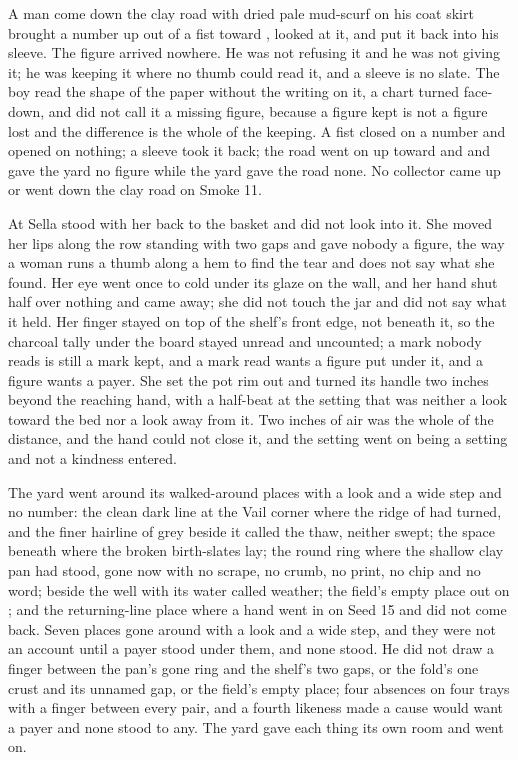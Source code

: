 A man come down the clay road with dried pale mud-scurf on his coat skirt brought a number up out of a fist toward , looked at it, and put it back into his sleeve. The figure arrived nowhere. He was not refusing it and he was not giving it; he was keeping it where no thumb could read it, and a sleeve is no slate. The boy read the shape of the paper without the writing on it, a chart turned face-down, and did not call it a missing figure, because a figure kept is not a figure lost and the difference is the whole of the keeping. A fist closed on a number and opened on nothing; a sleeve took it back; the road went on up toward  and  and gave the yard no figure while the yard gave the road none. No collector came up or went down the clay road on Smoke 11.

At  Sella stood with her back to the basket and did not look into it. She moved her lips along the row standing with two gaps and gave nobody a figure, the way a woman runs a thumb along a hem to find the tear and does not say what she found. Her eye went once to  cold under its glaze on the wall, and her hand shut half over nothing and came away; she did not touch the jar and did not say what it held. Her finger stayed on top of the shelf's front edge, not beneath it, so the charcoal tally under the board stayed unread and uncounted; a mark nobody reads is still a mark kept, and a mark read wants a figure put under it, and a figure wants a payer. She set the pot rim out and turned its handle two inches beyond the reaching hand, with a half-beat at the setting that was neither a look toward the bed nor a look away from it. Two inches of air was the whole of the distance, and the hand could not close it, and the setting went on being a setting and not a kindness entered.

The yard went around its walked-around places with a look and a wide step and no number: the clean dark line at the Vail corner where the ridge of  had turned, and the finer hairline of grey beside it called the thaw, neither swept; the space beneath  where the broken birth-slates lay; the round ring where the shallow clay pan had stood, gone now with no scrape, no crumb, no print, no chip and no word;  beside the well with its water called weather; the field's empty place out on ; and the returning-line place where a hand went in on Seed 15 and did not come back. Seven places gone around with a look and a wide step, and they were not an account until a payer stood under them, and none stood. He did not draw a finger between the pan's gone ring and the shelf's two gaps, or the fold's one crust and its unnamed gap, or the field's empty place; four absences on four trays with a finger between every pair, and a fourth likeness made a cause would want a payer and none stood to any. The yard gave each thing its own room and went on.

